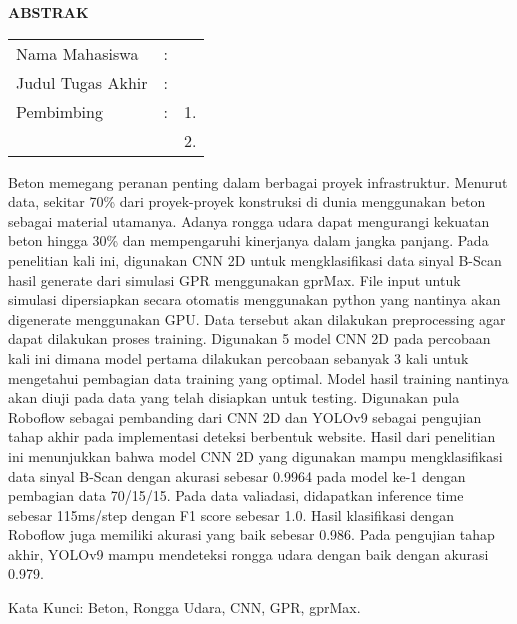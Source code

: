 \begin{center}
  \large\textbf{ABSTRAK}
\end{center}


\vspace{2ex}

\begingroup
\setlength{\tabcolsep}{0pt}

\noindent
\begin{tabularx}{\textwidth}{l >{\centering}m{2em} X}
  Nama Mahasiswa    & : & \name{}         \\

  Judul Tugas Akhir & : & \tatitle{}      \\

  Pembimbing        & : & 1. \advisor{}   \\
                    &   & 2. \coadvisor{} \\
\end{tabularx}
\endgroup

Beton memegang peranan penting dalam berbagai proyek infrastruktur. Menurut data, sekitar 70\% dari proyek-proyek konstruksi di dunia menggunakan beton sebagai material utamanya. Adanya rongga udara dapat mengurangi kekuatan beton hingga 30\% dan mempengaruhi kinerjanya dalam jangka panjang. Pada penelitian kali ini, digunakan CNN 2D untuk mengklasifikasi data sinyal B-Scan hasil generate dari simulasi GPR menggunakan gprMax. File input untuk simulasi dipersiapkan secara otomatis menggunakan python yang nantinya akan digenerate menggunakan GPU. Data tersebut akan dilakukan preprocessing agar dapat dilakukan proses training. Digunakan 5 model CNN 2D pada percobaan kali ini dimana model pertama dilakukan percobaan sebanyak 3 kali untuk mengetahui pembagian data training yang optimal. Model hasil training nantinya akan diuji pada data yang telah disiapkan untuk testing. Digunakan pula Roboflow sebagai pembanding dari CNN 2D dan YOLOv9 sebagai pengujian tahap akhir pada implementasi deteksi berbentuk website. Hasil dari penelitian ini menunjukkan bahwa model CNN 2D yang digunakan mampu mengklasifikasi data sinyal B-Scan dengan akurasi sebesar 0.9964 pada model ke-1 dengan pembagian data 70/15/15. Pada data valiadasi, didapatkan inference time sebesar 115ms/step dengan F1 score sebesar 1.0. Hasil klasifikasi dengan Roboflow juga memiliki akurasi yang baik sebesar 0.986. Pada pengujian tahap akhir, YOLOv9 mampu mendeteksi rongga udara dengan baik dengan akurasi 0.979.

Kata Kunci: Beton, Rongga Udara, CNN, GPR, gprMax.
